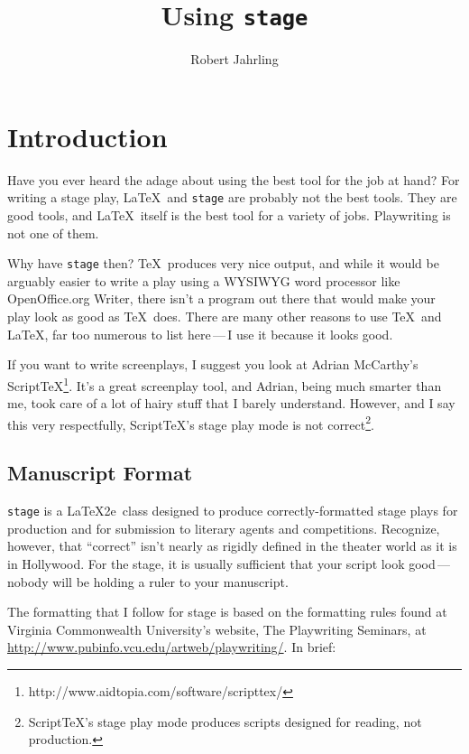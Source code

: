 \documentclass{report}
\begin{document}
\title{Using \texttt{stage}}
\author{Robert Jahrling}
\maketitle

\chapter{Introduction}

Have you ever heard the adage about using the best tool for the job at hand? For writing a stage play, \LaTeX\ and \texttt{stage} are probably not the best tools. They are good tools, and \LaTeX\ itself is the best tool for a variety of jobs. Playwriting is not one of them.

Why have \texttt{stage} then? \TeX\ produces very nice output, and while it would be arguably easier to write a play using a WYSIWYG word processor like OpenOffice.org Writer, there isn’t a program out there that would make your play look as good as \TeX\ does. There are many other reasons to use \TeX\ and \LaTeX, far too numerous to list here\,—\,I use it because it looks good.

If you want to write screenplays, I suggest you look at Adrian McCarthy’s Script\TeX\footnote{http://www.aidtopia.com/software/scripttex/}. It’s a great screenplay tool, and Adrian, being much smarter than me, took care of a lot of hairy stuff that I barely understand. However, and I say this very respectfully, Script\TeX’s stage play mode is not correct\footnote{Script\TeX’s stage play mode produces scripts designed for reading, not production.}.

\section{Manuscript Format}

\texttt{stage} is a \LaTeX2e\ class designed to produce correctly-formatted stage plays for production and for submission to literary agents and competitions. Recognize, however, that “correct” isn’t nearly as rigidly defined in the theater world as it is in Hollywood. For the stage, it is usually sufficient that your script look good\,—\,nobody will be holding a ruler to your manuscript.

The formatting that I follow for stage is based on the formatting rules found at Virginia Commonwealth University’s website, The Playwriting Seminars, at \url{http://www.pubinfo.vcu.edu/artweb/playwriting/}. In brief:
\end{document}
